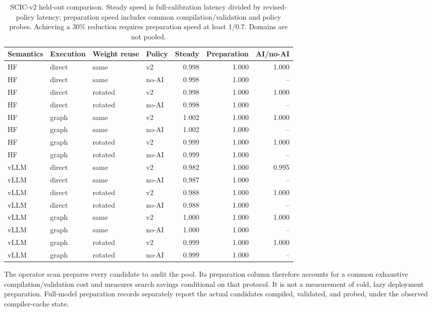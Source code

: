 \begin{table}[t]
\centering\small
\caption{SCIC-v2 held-out comparison. Steady speed is full-calibration latency divided by revised-policy latency; preparation speed includes common compilation/validation and policy probes. Achieving a 30\% reduction requires preparation speed at least $1/0.7$. Domains are not pooled.}
\label{tab:v2-selection}
\begin{tabular}{llllrrr}
\toprule
Semantics & Execution & Weight reuse & Policy & Steady & Preparation & AI/no-AI \\
\midrule
HF & direct & same & v2 & 0.998 & 1.000 & 1.000 \\
HF & direct & same & no-AI & 0.998 & 1.000 & -- \\
HF & direct & rotated & v2 & 0.998 & 1.000 & 1.000 \\
HF & direct & rotated & no-AI & 0.998 & 1.000 & -- \\
HF & graph & same & v2 & 1.002 & 1.000 & 1.000 \\
HF & graph & same & no-AI & 1.002 & 1.000 & -- \\
HF & graph & rotated & v2 & 0.999 & 1.000 & 1.000 \\
HF & graph & rotated & no-AI & 0.999 & 1.000 & -- \\
vLLM & direct & same & v2 & 0.982 & 1.000 & 0.995 \\
vLLM & direct & same & no-AI & 0.987 & 1.000 & -- \\
vLLM & direct & rotated & v2 & 0.988 & 1.000 & 1.000 \\
vLLM & direct & rotated & no-AI & 0.988 & 1.000 & -- \\
vLLM & graph & same & v2 & 1.000 & 1.000 & 1.000 \\
vLLM & graph & same & no-AI & 1.000 & 1.000 & -- \\
vLLM & graph & rotated & v2 & 0.999 & 1.000 & 1.000 \\
vLLM & graph & rotated & no-AI & 0.999 & 1.000 & -- \\
\bottomrule
\end{tabular}
\end{table}

The operator scan prepares every candidate to audit the pool. Its preparation column therefore accounts for a common exhaustive compilation/validation cost and measures search savings conditional on that protocol. It is not a measurement of cold, lazy deployment preparation. Full-model preparation records separately report the actual candidates compiled, validated, and probed, under the observed compiler-cache state.

